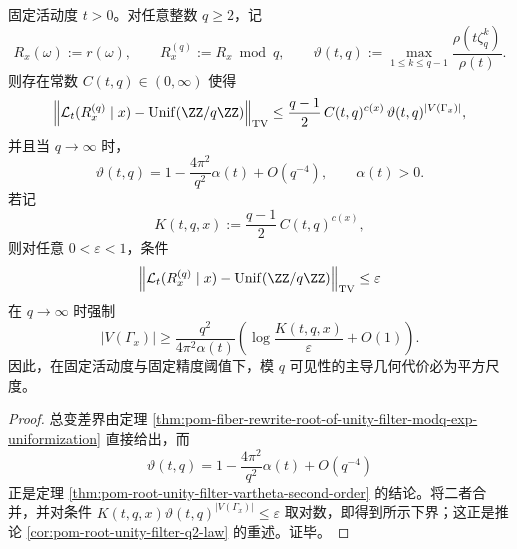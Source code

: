 \begin{theorem}[模同余可见律的平方尺度刚性]\label{thm:conclusion-fiber-modq-quadratic-scale-rigidity}
固定活动度 \(t>0\)。对任意整数 \(q\ge 2\)，记
\[
R_x(\omega):=r(\omega),
\qquad
R_x^{(q)}:=R_x\bmod q,
\qquad
\vartheta(t,q):=\max_{1\le k\le q-1}\frac{\rho(t\zeta_q^k)}{\rho(t)}.
\]
则存在常数 \(C(t,q)\in(0,\infty)\) 使得
\[
\left\|\mathcal L_t(R_x^{(q)}\mid x)-\mathrm{Unif}(\ZZ/q\ZZ)\right\|_{\mathrm{TV}}
\le
\frac{q-1}{2}\,C(t,q)^{c(x)}\,\vartheta(t,q)^{|V(\Gamma_x)|},
\]
并且当 \(q\to\infty\) 时，
\[
\vartheta(t,q)
=
1-\frac{4\pi^2}{q^2}\alpha(t)+O(q^{-4}),
\qquad
\alpha(t)>0.
\]
若记
\[
K(t,q,x):=\frac{q-1}{2}\,C(t,q)^{c(x)},
\]
则对任意 \(0<\varepsilon<1\)，条件
\[
\left\|\mathcal L_t(R_x^{(q)}\mid x)-\mathrm{Unif}(\ZZ/q\ZZ)\right\|_{\mathrm{TV}}\le \varepsilon
\]
在 \(q\to\infty\) 时强制
\[
|V(\Gamma_x)|
\ge
\frac{q^2}{4\pi^2\alpha(t)}
\left(\log\frac{K(t,q,x)}{\varepsilon}+O(1)\right).
\]
因此，在固定活动度与固定精度阈值下，模 \(q\) 可见性的主导几何代价必为平方尺度。
\end{theorem}
\begin{proof}
总变差界由定理 \ref{thm:pom-fiber-rewrite-root-of-unity-filter-modq-exp-uniformization} 直接给出，而
\[
\vartheta(t,q)
=
1-\frac{4\pi^2}{q^2}\alpha(t)+O(q^{-4})
\]
正是定理 \ref{thm:pom-root-unity-filter-vartheta-second-order} 的结论。将二者合并，并对条件
\(
K(t,q,x)\vartheta(t,q)^{|V(\Gamma_x)|}\le \varepsilon
\)
取对数，即得到所示下界；这正是推论 \ref{cor:pom-root-unity-filter-q2-law} 的重述。证毕。
\end{proof}

